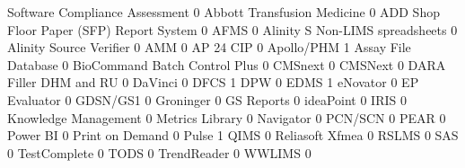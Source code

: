 \documentclass{article}
\begin{document}
\begin{Schunk}
\begin{Soutput}
                                           Software Compliance Assessment
                                                                        0
  Abbott Transfusion Medicine                                           0
  ADD Shop Floor Paper (SFP) Report System                              0
  AFMS                                                                  0
  Alinity S Non-LIMS spreadsheets                                       0
  Alinity Source Verifier                                               0
  AMM                                                                   0
  AP 24 CIP                                                             0
  Apollo/PHM                                                            1
  Assay File Database                                                   0
  BioCommand Batch Control Plus                                         0
  CMSnext                                                               0
  CMSNext                                                               0
  DARA Filler DHM and RU                                                0
  DaVinci                                                               0
  DFCS                                                                  1
  DPW                                                                   0
  EDMS                                                                  1
  eNovator                                                              0
  EP Evaluator                                                          0
  GDSN/GS1                                                              0
  Groninger                                                             0
  GS Reports                                                            0
  ideaPoint                                                             0
  IRIS                                                                  0
  Knowledge Management                                                  0
  Metrics Library                                                       0
  Navigator                                                             0
  PCN/SCN                                                               0
  PEAR                                                                  0
  Power BI                                                              0
  Print on Demand                                                       0
  Pulse                                                                 1
  QIMS                                                                  0
  Reliasoft Xfmea                                                       0
  RSLMS                                                                 0
  SAS                                                                   0
  TestComplete                                                          0
  TODS                                                                  0
  TrendReader                                                           0
  WWLIMS                                                                0
                                          

\end{Soutput}
\end{Schunk}
\end{document}
